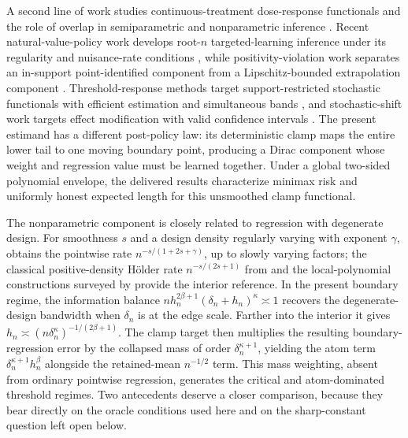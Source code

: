 \documentclass[11pt]{article}
\begin{document}
A second line of work studies continuous-treatment dose-response functionals and the role of overlap in semiparametric and nonparametric inference \citep{Imbens2000,Hirano2005,Imai2004,KennedyMaMcHughSmall2017,BonviniKennedy2026}. Recent natural-value-policy work develops root-\(n\) targeted-learning inference under its regularity and nuisance-rate conditions \citep{Diaz2026}, while positivity-violation work separates an in-support point-identified component from a Lipschitz-bounded extrapolation component \citep{Koo2026}. Threshold-response methods target support-restricted stochastic functionals with efficient estimation and simultaneous bands \citep{vanderLaanZhangGilbert2023}, and stochastic-shift work targets effect modification with valid confidence intervals \citep{McCoyZhangHubbardvanderLaanSchuler2026}. The present estimand has a different post-policy law: its deterministic clamp maps the entire lower tail to one moving boundary point, producing a Dirac component whose weight and regression value must be learned together. Under a global two-sided polynomial envelope, the delivered results characterize minimax risk and uniformly honest expected length for this unsmoothed clamp functional.

The nonparametric component is closely related to regression with degenerate design. For smoothness \(s\) and a design density regularly varying with exponent \(\gamma\), \citet{Gaiffas2005DegenerateDesign} obtains the pointwise rate \(n^{-s/(1+2s+\gamma)}\), up to slowly varying factors; the classical positive-density Hölder rate \(n^{-s/(2s+1)}\) from \citet{Stone1982} and the local-polynomial constructions surveyed by \citet{Fan1996} provide the interior reference. In the present boundary regime, the information balance \(n h_n^{2\beta+1}(\delta_n+h_n)^\kappa\asymp1\) recovers the degenerate-design bandwidth when \(\delta_n\) is at the edge scale. Farther into the interior it gives \(h_n\asymp(n\delta_n^\kappa)^{-1/(2\beta+1)}\). The clamp target then multiplies the resulting boundary-regression error by the collapsed mass of order \(\delta_n^{\kappa+1}\), yielding the atom term \(\delta_n^{\kappa+1}h_n^\beta\) alongside the retained-mean \(n^{-1/2}\) term. This mass weighting, absent from ordinary pointwise regression, generates the critical and atom-dominated threshold regimes.  Two antecedents deserve a closer comparison, because they bear directly on the oracle conditions used here and on the sharp-constant question left open below.
\end{document}
